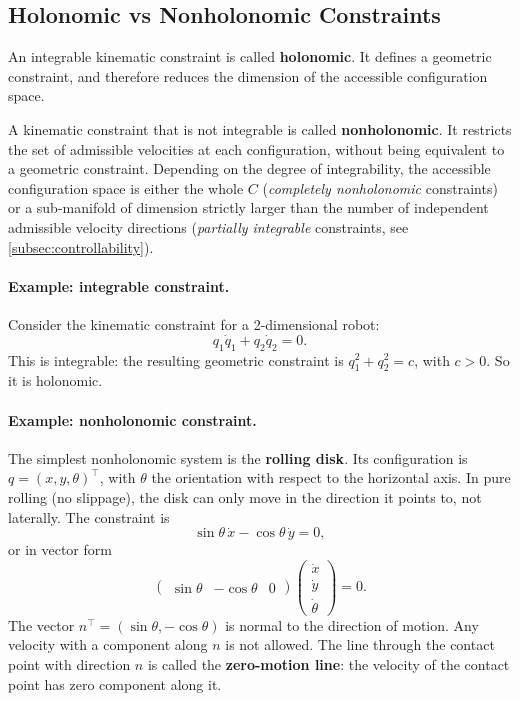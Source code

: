 \subsection{Holonomic vs Nonholonomic Constraints}
\label{subsec:holonomic-nonholonomic}

\begin{definition}
\label{def:holonomic}
An integrable kinematic constraint is called \textbf{holonomic}. It
defines a geometric constraint, and therefore reduces the dimension of
the accessible configuration space.
\end{definition}

\begin{definition}
\label{def:nonholonomic}
A kinematic constraint that is not integrable is called
\textbf{nonholonomic}. It restricts the set of admissible velocities at
each configuration, without being equivalent to a geometric constraint.
Depending on the degree of integrability, the accessible configuration
space is either the whole \( C \) (\emph{completely nonholonomic}
constraints) or a sub-manifold of dimension strictly larger than the
number of independent admissible velocity directions (\emph{partially
integrable} constraints, see \cref{subsec:controllability}).
\end{definition}

\paragraph{Example: integrable constraint.}
Consider the kinematic constraint for a 2-dimensional robot:
\[
q_1 \dot{q}_1 + q_2 \dot{q}_2 = 0.
\]
This is integrable: the resulting geometric constraint is
\( q_1^2 + q_2^2 = c \), with \( c > 0 \). So it is holonomic.

\paragraph{Example: nonholonomic constraint.}
The simplest nonholonomic system is the \textbf{rolling disk}. Its
configuration is \( q = (x, y, \theta)^\top \), with \( \theta \) the
orientation with respect to the horizontal axis. In pure rolling (no
slippage), the disk can only move in the direction it points to, not
laterally. The constraint is
\begin{equation}
\label{eq:rolling}
    \sin\theta \, \dot{x} - \cos\theta \, \dot{y} = 0,
\end{equation}
or in vector form
\[
\begin{pmatrix} \sin\theta & -\cos\theta & 0 \end{pmatrix}
\begin{pmatrix} \dot{x} \\ \dot{y} \\ \dot{\theta} \end{pmatrix} = 0.
\]
The vector \( n^\top = (\sin\theta, -\cos\theta) \) is normal to the
direction of motion. Any velocity with a component along \( n \) is
not allowed. The line through the contact point with direction \( n \)
is called the \textbf{zero-motion line}: the velocity of the contact
point has zero component along it.

